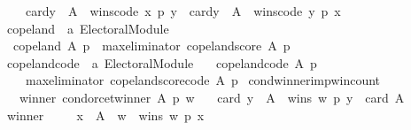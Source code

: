 \begin{isabellebody}
\ \ \ \ card{\isacharbraceleft}{\kern0pt}y\ {\isasymin}\ A\ {\isachardot}{\kern0pt}\ wins{\isacharunderscore}{\kern0pt}code\ x\ p\ y{\isacharbraceright}{\kern0pt}\ {\isacharminus}{\kern0pt}\ card{\isacharbraceleft}{\kern0pt}y\ {\isasymin}\ A\ {\isachardot}{\kern0pt}\ wins{\isacharunderscore}{\kern0pt}code\ y\ p\ x{\isacharbraceright}{\kern0pt}{\isachardoublequoteclose}\isanewline
\isanewline
{}\isamarkupfalse%
\ copeland\ {\isacharcolon}{\kern0pt}{\isacharcolon}{\kern0pt}\ {\isachardoublequoteopen}{\isacharprime}{\kern0pt}a\ Electoral{\isacharunderscore}{\kern0pt}Module{\isachardoublequoteclose}\ \isanewline
\ \ {\isachardoublequoteopen}copeland\ A\ p\ {\isacharequal}{\kern0pt}\ max{\isacharunderscore}{\kern0pt}eliminator\ copeland{\isacharunderscore}{\kern0pt}score\ A\ p{\isachardoublequoteclose}\isanewline
\isanewline
{}\isamarkupfalse%
\ copeland{\isacharunderscore}{\kern0pt}code\ {\isacharcolon}{\kern0pt}{\isacharcolon}{\kern0pt}\ {\isachardoublequoteopen}{\isacharprime}{\kern0pt}a\ Electoral{\isacharunderscore}{\kern0pt}Module{\isachardoublequoteclose}\ \isanewline
\ \ {\isachardoublequoteopen}copeland{\isacharunderscore}{\kern0pt}code\ A\ p\ {\isacharequal}{\kern0pt}\isanewline
\ \ \ \ max{\isacharunderscore}{\kern0pt}eliminator\ copeland{\isacharunderscore}{\kern0pt}score{\isacharunderscore}{\kern0pt}code\ A\ p{\isachardoublequoteclose}%
\isadelimdocument
%
\endisadelimdocument
%
\isatagdocument
%
\isamarkuptrue%
%
\endisatagdocument
{\isafolddocument}%
%
\isadelimdocument
%
\endisadelimdocument
{}\isamarkupfalse%
\ cond{\isacharunderscore}{\kern0pt}winner{\isacharunderscore}{\kern0pt}imp{\isacharunderscore}{\kern0pt}win{\isacharunderscore}{\kern0pt}count{\isacharcolon}{\kern0pt}\isanewline
\ \ \ winner{\isacharcolon}{\kern0pt}\ {\isachardoublequoteopen}condorcet{\isacharunderscore}{\kern0pt}winner\ A\ p\ w{\isachardoublequoteclose}\isanewline
\ \ \ {\isachardoublequoteopen}card\ {\isacharbraceleft}{\kern0pt}y\ {\isasymin}\ A\ {\isachardot}{\kern0pt}\ wins\ w\ p\ y{\isacharbraceright}{\kern0pt}\ {\isacharequal}{\kern0pt}\ card\ A\ {\isacharminus}{\kern0pt}{}{\isachardoublequoteclose}\isanewline
%
\isadelimproof
%
\endisadelimproof
%
\isatagproof
{}\isamarkupfalse%
\ {\isacharminus}{\kern0pt}\isanewline
\ \ \isamarkupfalse%
\ winner\isanewline
\ \ \isamarkupfalse%
\ {}{\isacharcolon}{\kern0pt}\ {\isachardoublequoteopen}{\isasymforall}x\ {\isasymin}\ A\ {\isacharminus}{\kern0pt}\ {\isacharbraceleft}{\kern0pt}w{\isacharbraceright}{\kern0pt}\ {\isachardot}{\kern0pt}\ wins\ w\ p\ x{\isachardoublequoteclose}\isanewline

\end{isabellebody}
